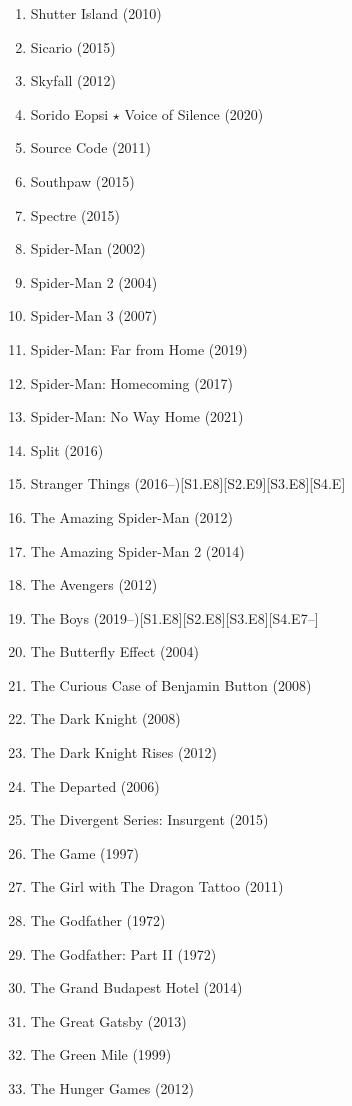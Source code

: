 \documentclass{article}
\begin{document}
\begin{enumerate}
	\item {\sc Shutter Island} (2010)
	\item {\sc Sicario} (2015)
	\item {\sc Skyfall} (2012)
	\item {\sc Sorido Eopsi $\star$ Voice of Silence} (2020)
	\item {\sc Source Code} (2011)
	\item {\sc Southpaw} (2015)
	\item {\sc Spectre} (2015)
	\item {\sc Spider-Man} (2002)
	\item {\sc Spider-Man 2} (2004)
	\item {\sc Spider-Man 3} (2007)
	\item {\sc Spider-Man: Far from Home} (2019)
	\item {\sc Spider-Man: Homecoming} (2017)
	\item {\sc Spider-Man: No Way Home} (2021)
	\item {\sc Split} (2016)
	\item Stranger Things (2016--)\hfill[S1.E8][S2.E9][S3.E8][S4.E]
	\item {\sc The Amazing Spider-Man} (2012)
	\item {\sc The Amazing Spider-Man 2} (2014)
	\item {\sc The Avengers} (2012)
	\item The Boys (2019--)\hfill[S1.E8][S2.E8][S3.E8][S4.E7--]
	\item {\sc The Butterfly Effect} (2004)
	\item {\sc The Curious Case of Benjamin Button} (2008)
	\item {\sc The Dark Knight} (2008)
	\item {\sc The Dark Knight Rises} (2012)
	\item {\sc The Departed} (2006)
	\item {\sc The Divergent Series: Insurgent} (2015)
	\item {\sc The Game} (1997)
	\item {\sc The Girl with The Dragon Tattoo} (2011)
	\item {\sc The Godfather} (1972)
	\item {\sc The Godfather: Part II} (1972)
	\item {\sc The Grand Budapest Hotel} (2014)
	\item {\sc The Great Gatsby} (2013)
	\item {\sc The Green Mile} (1999)
	\item {\sc The Hunger Games} (2012)

\end{enumerate}
\end{document}
